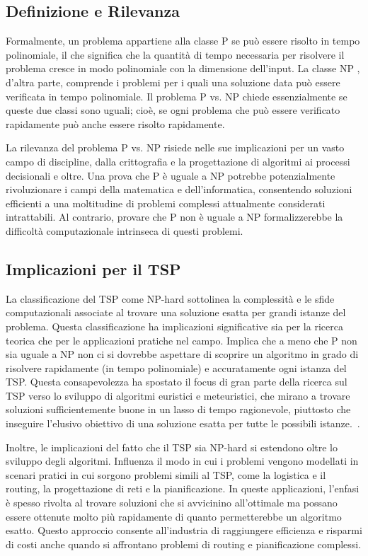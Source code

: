 \subsection{Definizione e Rilevanza}

Formalmente, un problema appartiene alla classe \gls{P} se può essere risolto in tempo polinomiale, il che significa che la quantità di tempo necessaria per risolvere il problema cresce in modo polinomiale con la dimensione dell'input. La classe \gls{NP} , d'altra parte, comprende i problemi per i quali una soluzione data può essere verificata in tempo polinomiale. Il problema \gls{P} vs. \gls{NP} chiede essenzialmente se queste due classi sono uguali; cioè, se ogni problema che può essere verificato rapidamente può anche essere risolto rapidamente.

La rilevanza del problema \gls{P} vs. \gls{NP} risiede nelle sue implicazioni per un vasto campo di discipline, dalla crittografia e la progettazione di algoritmi ai processi decisionali e oltre. Una prova che \gls{P} è uguale a \gls{NP} potrebbe potenzialmente rivoluzionare i campi della matematica e dell'informatica, consentendo soluzioni efficienti a una moltitudine di problemi complessi attualmente considerati intrattabili. Al contrario, provare che \gls{P} non è uguale a \gls{NP} formalizzerebbe la difficoltà computazionale intrinseca di questi problemi.

\subsection{Implicazioni per il \gls{TSP}}

La classificazione del \gls{TSP} come \gls{NP}-hard sottolinea la complessità e le sfide computazionali associate al trovare una soluzione esatta per grandi istanze del problema. Questa classificazione ha implicazioni significative sia per la ricerca teorica che per le applicazioni pratiche nel campo. Implica che a meno che \gls{P} non sia uguale a \gls{NP} non ci si dovrebbe aspettare di scoprire un algoritmo in grado di risolvere rapidamente (in tempo polinomiale) e accuratamente ogni istanza del \gls{TSP}. Questa consapevolezza ha spostato il focus di gran parte della ricerca sul \gls{TSP} verso lo sviluppo di algoritmi euristici e meteuristici, che mirano a trovare soluzioni sufficientemente buone in un lasso di tempo ragionevole, piuttosto che inseguire l'elusivo obiettivo di una soluzione esatta per tutte le possibili istanze.~\cite{Karp1972}.

Inoltre, le implicazioni del fatto che il \gls{TSP} sia \gls{NP}-hard si estendono oltre lo sviluppo degli algoritmi. Influenza il modo in cui i problemi vengono modellati in scenari pratici in cui sorgono problemi simili al \gls{TSP}, come la logistica e il routing, la progettazione di reti e la pianificazione. In queste applicazioni, l'enfasi è spesso rivolta al trovare soluzioni che si avvicinino all'ottimale ma possano essere ottenute molto più rapidamente di quanto permetterebbe un algoritmo esatto. Questo approccio consente all'industria di raggiungere efficienza e risparmi di costi anche quando si affrontano problemi di routing e pianificazione complessi.

